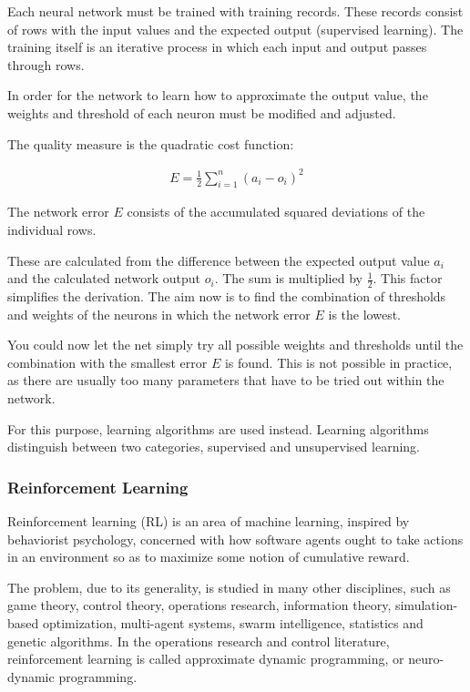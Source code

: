 Each neural network must be trained with training records.
These records consist of rows with the input values and the
expected output (supervised learning). The training itself
is an iterative process in which each input and output
passes through rows.\cite{ct_math}

In order for the network to learn how to approximate the
output value, the weights and threshold of each neuron must
be modified and adjusted.

The quality measure is the quadratic cost function:

\begin{align*}
  E = \frac{1}{2}\sum_{i=1}^{n}(a_i-o_i)^2
\end{align*}

The network error $E$ consists of the accumulated squared
deviations of the individual rows.

These are calculated from the difference between the
expected output value $a_i$ and the calculated network
output $o_i$. The sum is multiplied by $\frac{1}{2}$. This
factor simplifies the derivation. The aim now is to find
the combination of thresholds and weights of the neurons in
which the network error $E$ is the lowest.

You could now let the net simply try all possible weights
and thresholds until the combination with the smallest
error $E$ is found. This is not possible in practice, as
there are usually too many parameters that have to be tried
out within the network.\cite{ct_math}

For this purpose, learning algorithms are used instead.
Learning algorithms distinguish between two categories,
supervised and unsupervised learning.

\subsubsection{Reinforcement Learning}

Reinforcement learning (RL) is an area of machine learning,
inspired by behaviorist psychology, concerned with how
software agents ought to take actions in an environment so
as to maximize some notion of cumulative reward.

The problem, due to its generality, is studied in many
other disciplines, such as game theory, control theory,
operations research, information theory, simulation-based
optimization, multi-agent systems, swarm intelligence,
statistics and genetic algorithms. In the operations
research and control literature, reinforcement learning is
called approximate dynamic programming, or neuro-dynamic
programming.

